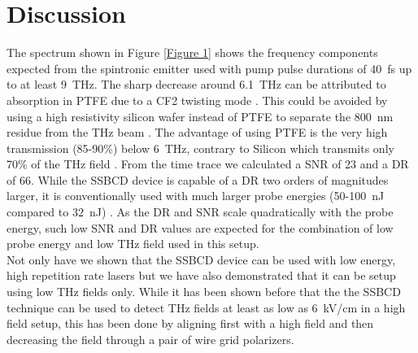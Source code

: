 \documentclass{article}
\begin{document}
\section{Discussion}
The spectrum shown in Figure \ref{Figure 1} shows the frequency components expected from the spintronic emitter used with pump pulse durations of \mbox{40 fs} up to at least \mbox{9 THz}. The sharp decrease around \mbox{6.1 THz} can be attributed to absorption in PTFE due to a CF2 twisting mode \cite{dangelo-2014}. This could be avoided by using a high resistivity silicon wafer instead of PTFE to separate the \mbox{800 nm} residue from the THz beam \cite{dai-2004}. The advantage of using PTFE is the very high transmission \mbox{(85-90\%)} below \mbox{6 THz}, contrary to Silicon which transmits only 70\% of the THz field \cite{dangelo-2014}. From the time trace we calculated a SNR of 23 and a DR of 66. While the SSBCD device is capable of a DR two orders of magnitudes larger, it is conventionally used with much larger probe energies (\mbox{50-100 nJ} compared to \mbox{32 nJ}) \cite{tomasino-2017, tomasino-2018, tomasino-2021}. As the DR and SNR scale quadratically with the probe energy, such low SNR and DR values are expected for the combination of low probe energy and low THz field used in this setup. \\
Not only have we shown that the SSBCD device can be used with low energy, high repetition rate lasers but we have also demonstrated that it can be setup using low THz fields only. While it has been shown before that the the SSBCD technique can be used to detect THz fields at least as low as \mbox{6 kV/cm} in a high field setup, this has been done by aligning first with a high field and then decreasing the field through a pair of wire grid polarizers.
\\~\\
\end{document}
